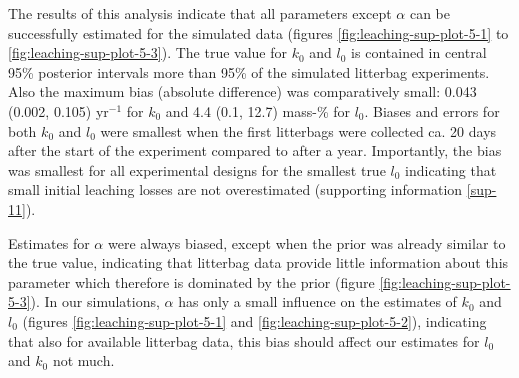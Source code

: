 \documentclass[
  12pt,
]{article}
\begin{document}
The results of this analysis indicate that all parameters except \(\alpha\) can be successfully estimated for the simulated data (figures \ref{fig:leaching-sup-plot-5-1} to \ref{fig:leaching-sup-plot-5-3}). The true value for \(k_0\) and \(l_0\) is contained in central 95\% posterior intervals more than 95\% of the simulated litterbag experiments. Also the maximum bias (absolute difference) was comparatively small: 0.043 (0.002, 0.105) yr\(^{-1}\) for \(k_0\) and 4.4 (0.1, 12.7) mass-\% for \(l_0\). Biases and errors for both \(k_0\) and \(l_0\) were smallest when the first litterbags were collected ca. 20 days after the start of the experiment compared to after a year. Importantly, the bias was smallest for all experimental designs for the smallest true \(l_0\) indicating that small initial leaching losses are not overestimated (supporting information \ref{sup-11}).

Estimates for \(\alpha\) were always biased, except when the prior was already similar to the true value, indicating that litterbag data provide little information about this parameter which therefore is dominated by the prior (figure \ref{fig:leaching-sup-plot-5-3}). In our simulations, \(\alpha\) has only a small influence on the estimates of \(k_0\) and \(l_0\) (figures \ref{fig:leaching-sup-plot-5-1} and \ref{fig:leaching-sup-plot-5-2}), indicating that also for available litterbag data, this bias should affect our estimates for \(l_0\) and \(k_0\) not much.
\end{document}
